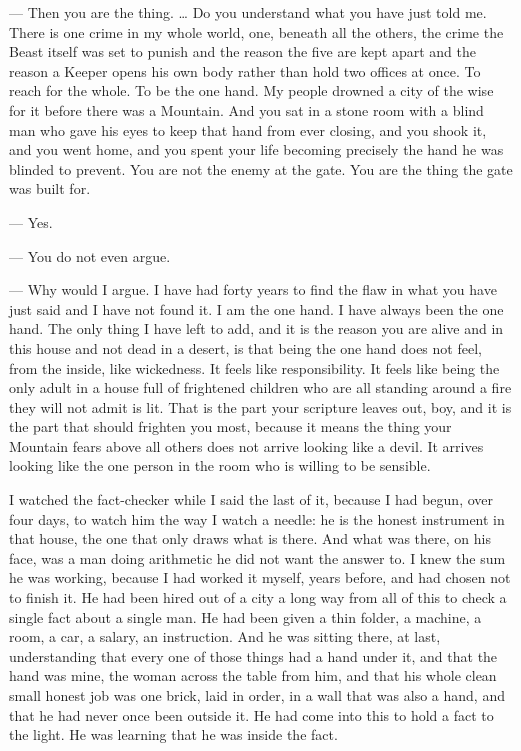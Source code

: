 \begin{room}

--- Then you are the thing. \ldots{} Do you understand what you have just told me. There is one crime in my whole world, one, beneath all the others, the crime the Beast itself was set to punish and the reason the five are kept apart and the reason a Keeper opens his own body rather than hold two offices at once. To reach for the whole. To be the one hand. My people drowned a city of the wise for it before there was a Mountain. And you sat in a stone room with a blind man who gave his eyes to keep that hand from ever closing, and you shook it, and you went home, and you spent your life becoming precisely the hand he was blinded to prevent. You are not the enemy at the gate. You are the thing the gate was built for.

--- Yes.

--- You do not even argue.

--- Why would I argue. I have had forty years to find the flaw in what you have just said and I have not found it. I am the one hand. I have always been the one hand. The only thing I have left to add, and it is the reason you are alive and in this house and not dead in a desert, is that being the one hand does not feel, from the inside, like wickedness. It feels like responsibility. It feels like being the only adult in a house full of frightened children who are all standing around a fire they will not admit is lit. That is the part your scripture leaves out, boy, and it is the part that should frighten you most, because it means the thing your Mountain fears above all others does not arrive looking like a devil. It arrives looking like the one person in the room who is willing to be sensible.

\end{room}

I watched the fact-checker while I said the last of it, because I had begun, over four days, to watch him the way I watch a needle: he is the honest instrument in that house, the one that only draws what is there. And what was there, on his face, was a man doing arithmetic he did not want the answer to. I knew the sum he was working, because I had worked it myself, years before, and had chosen not to finish it. He had been hired out of a city a long way from all of this to check a single fact about a single man. He had been given a thin folder, a machine, a room, a car, a salary, an instruction. And he was sitting there, at last, understanding that every one of those things had a hand under it, and that the hand was mine, the woman across the table from him, and that his whole clean small honest job was one brick, laid in order, in a wall that was also a hand, and that he had never once been outside it. He had come into this to hold a fact to the light. He was learning that he was inside the fact.\par

